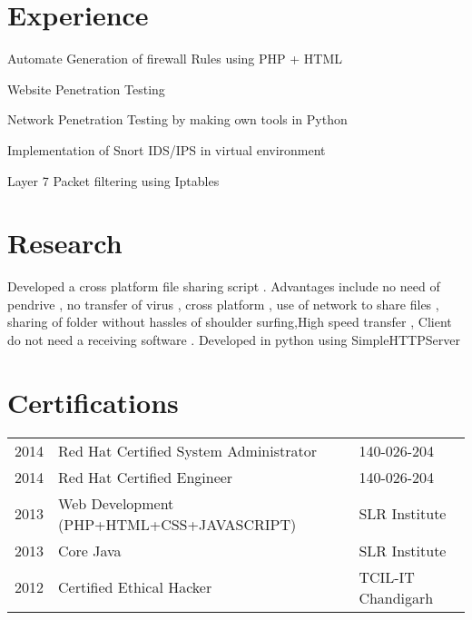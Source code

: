 \documentclass[]{deedy-resume-openfont}
\begin{document}
\begin{minipage}[t]{0.66\textwidth} 


\section{Experience}

\vspace{\topsep} %
\begin{tightemize}
\item Automate Generation of firewall Rules using PHP + HTML
\item Website Penetration Testing 
\item Network Penetration Testing by making own tools in Python 
\item Implementation of Snort IDS/IPS in virtual environment
\item Layer 7 Packet filtering using Iptables
\end{tightemize}
\sectionsep



\section{Research}
Developed a cross platform file sharing script . Advantages include no need of pendrive , no transfer of virus , cross platform , use of network to share files , sharing of folder without hassles of shoulder surfing,High speed transfer , Client do not need a receiving software . Developed in python using SimpleHTTPServer
\sectionsep




\section{Certifications} 
\begin{tabular}{rll}
2014	     & Red Hat Certified System Administrator  & 140-026-204\\
2014	     & Red Hat Certified Engineer  & 140-026-204\\
2013	     & Web Development (PHP+HTML+CSS+JAVASCRIPT)  & SLR Institute\\
2013	     & Core Java  & SLR Institute\\
2012	     & Certified Ethical Hacker  & TCIL-IT Chandigarh\\


\end{tabular}
\end{minipage}
\end{document}
